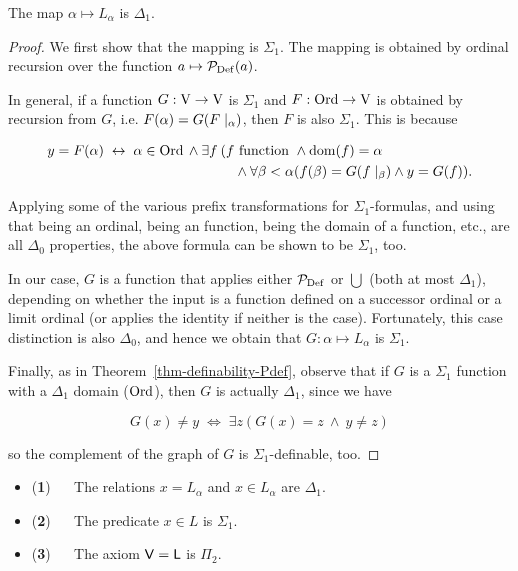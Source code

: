 \begin{proposition}\label{prop-map-lalpha}The map $\alpha \mapsto L_\alpha$ is $\Delta_1$.

\end{proposition}\begin{proof}We first show that the mapping is $\Sigma_1$. The mapping is obtained by ordinal recursion over the function $a \mapsto \mathcal{P}_{\operatorname{Def}}(a)$.

In general, if a function $G: \operatorname{V} \to \operatorname{V}$ is $\Sigma_1$ and $F: \operatorname{Ord} \to \operatorname{V}$ is obtained by recursion from $G$, i.e. $F(\alpha) = G(F\mid_{\alpha})$, then $F$ is also $\Sigma_1$. This is because

\begin{align*}
    y= F(\alpha) \; \leftrightarrow \; \alpha \in \operatorname{Ord} \: \wedge \: \exists f \: & ( f \text{ function } \wedge \operatorname{dom}(f) = \alpha \\
        & \quad \wedge \forall \beta < \alpha (f(\beta) = G(f \mid_{\beta}) \wedge y = G(f)).
\end{align*}

Applying some of the various prefix transformations for $\Sigma_1$-formulas, and using that being an ordinal, being an function, being the domain of a function, etc., are all $\Delta_0$ properties, the above formula can be shown to be $\Sigma_1$, too.

In our case, $G$ is a function that applies either $\mathcal{P}_{\operatorname{Def}}$ or $\bigcup$ (both at most $\Delta_1$), depending on whether the input is a function defined on a successor ordinal or a limit ordinal (or applies the identity if neither is the case). Fortunately, this case distinction is also $\Delta_0$, and hence we obtain that $G: \alpha \mapsto L_\alpha$ is $\Sigma_1$.

Finally, as in Theorem~\ref{thm-definability-Pdef}, observe that if $G$ is a $\Sigma_1$ function with a $\Delta_1$ domain ($\operatorname{Ord}$), then $G$ is actually $\Delta_1$, since we have

\begin{equation}
G(x) \neq y \; \Leftrightarrow \; \exists z (G(x)=z \: \wedge \: y \neq z)
\end{equation}

so the complement of the graph of $G$ is $\Sigma_1$-definable, too.

\end{proof}\begin{corollary}\label{cor-complexity-l}\begin{itemize}
\item (\textbf{1}) $\quad$   The relations $x = L_\alpha$ and $x \in L_\alpha$ are $\Delta_1$.
\item (\textbf{2}) $\quad$   The predicate $x \in L$ is $\Sigma_1$.
\item (\textbf{3}) $\quad$   The axiom $\mathsf{V=L}$ is $\Pi_2$.
\end{itemize}


\end{corollary}
